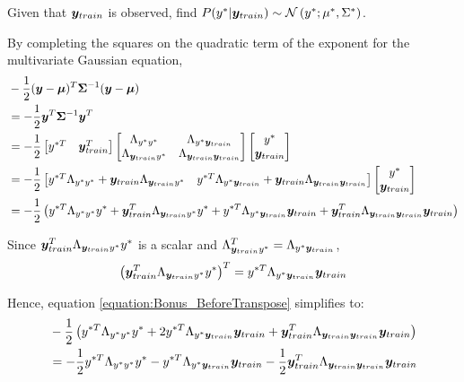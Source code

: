 \documentclass[a4paper,12pt]{article}
\begin{document}
Given that $\bm{y}_{train}$ is observed, find $P(y^* | \bm{y}_{train}) \sim \mathcal{N} 
\left( y^*; \mu^*, \Sigma^* \right)$. \vspace{1em}

By completing the squares on the quadratic term of the exponent for the multivariate Gaussian equation,
\begin{align}
\begin{split}
	& - \frac{1}{2} ( \bm{y} - \bm{\mu} )^{T} \bm{\Sigma}^{-1} ( \bm{y} - \bm{\mu} ) \\
    & = - \frac{1}{2} \bm{y}^{T} \bm{\Sigma}^{-1} \bm{y}^{T} \\
    & = - \frac{1}{2} \begin{bmatrix} y^{*T} & \bm{y}_{train}^{T} \end{bmatrix}
    	\begin{bmatrix} \Lambda_{y^* y^*} & \Lambda_{y^* \bm{y}_{train}} \\ \Lambda_{\bm{y}_{train} y^*} & \Lambda_{\bm{y}_{train} \bm{y}_{train}} \end{bmatrix} \begin{bmatrix} y^* \\ \bm{y}_{train} \end{bmatrix} \\
    & = - \frac{1}{2} \begin{bmatrix} 
    		y^{*T} \Lambda_{y^* y^*} + \bm{y}_{train} \Lambda_{\bm{y}_{train} y^*} 
            & y^{*T} \Lambda_{y^* \bm{y}_{train}} + \bm{y}_{train} \Lambda_{\bm{y}_{train} \bm{y}_{train}} 
    	\end{bmatrix} \begin{bmatrix} y^* \\ \bm{y}_{train} \end{bmatrix} \\
    & \label{equation:Bonus_BeforeTranspose}= - \frac{1}{2} \left( 
    	y^{*T} \Lambda_{y^* y^*} y^* 
        + \bm{y}_{train}^{T} \Lambda_{\bm{y}_{train} y^*} y^*
        + y^{*T} \Lambda_{y^* \bm{y}_{train}} \bm{y}_{train}
        + \bm{y}_{train}^{T} \Lambda_{\bm{y}_{train} \bm{y}_{train}} \bm{y}_{train}
		\right)
\end{split}
\end{align}

Since $ \bm{y}_{train}^{T} \Lambda_{\bm{y}_{train} y^*} y^* $ is a scalar and 
$\Lambda_{\bm{y}_{train} y^*}^{T} = \Lambda_{y^* \bm{y}_{train}}$,
\begin{align}
	\left( \bm{y}_{train}^{T} \Lambda_{\bm{y}_{train} y^*} y^* \right)^{T} = 
    y^{*T} \Lambda_{y^* \bm{y}_{train}} \bm{y}_{train}
\end{align}

Hence, equation \ref{equation:Bonus_BeforeTranspose} simplifies to:
\begin{align}
\begin{split}
	& - \frac{1}{2} \left(
    	y^{*T} \Lambda_{y^* y^*} y^* 
    	+ 2 y^{*T} \Lambda_{y^* \bm{y}_{train}} \bm{y}_{train}
    	+ \bm{y}_{train}^{T} \Lambda_{\bm{y}_{train} \bm{y}_{train}} \bm{y}_{train}
    	\right) \\
    & \label{equation:Bonus_AfterTranspose} = - \frac{1}{2} y^{*T} \Lambda_{y^* y^*} y^* 
    	- y^{*T} \Lambda_{y^* \bm{y}_{train}} \bm{y}_{train}
    	- \frac{1}{2} \bm{y}_{train}^{T} \Lambda_{\bm{y}_{train} \bm{y}_{train}} \bm{y}_{train}
\end{split}
\end{align}
\end{document}
